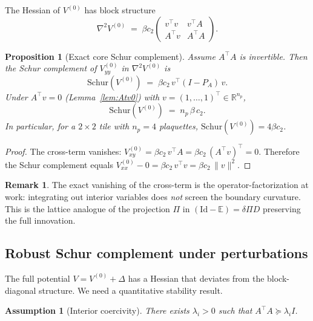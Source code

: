 \documentclass[11pt]{article}
\newtheorem{proposition}[theorem]{Proposition}
\newtheorem{assumption}[theorem]{Assumption}
\theoremstyle{definition}
\newtheorem{remark}[theorem]{Remark}
\newcommand{\E}{\mathbb{E}}
\newcommand{\1}{\mathbf{1}}
\newcommand{\R}{\mathbb{R}}
\newcommand{\norm}[1]{\lVert #1\rVert}
\begin{document}
The Hessian of $V^{(0)}$ has block structure
\begin{equation}\label{eq:hessian}
\nabla^2 V^{(0)} \;=\; \beta c_2
\begin{pmatrix}
v^\top v & v^\top A \\
A^\top v & A^\top A
\end{pmatrix}.
\end{equation}

\begin{proposition}[Exact core Schur complement]\label{prop:core-schur}
Assume $A^\top A$ is invertible.  Then the Schur complement of $V_{yy}^{(0)}$ in $\nabla^2 V^{(0)}$ is
\begin{equation}\label{eq:core-schur}
\mathrm{Schur}(V^{(0)}) \;=\; \beta c_2\,v^\top(I-P_A)\,v.
\end{equation}
Under $A^\top v = 0$ (Lemma~\ref{lem:Atv0}) with $v=(1,\ldots,1)^\top\in\R^{n_p}$,
\begin{equation}\label{eq:schur-value}
\mathrm{Schur}(V^{(0)}) \;=\; n_p\,\beta\, c_2.
\end{equation}
In particular, for a $2\times 2$ tile with $n_p=4$ plaquettes, $\mathrm{Schur}(V^{(0)})=4\beta c_2$.
\end{proposition}

\begin{proof}
The cross-term vanishes: $V_{xy}^{(0)}=\beta c_2\,v^\top A = \beta c_2\,(A^\top v)^\top = 0$.
Therefore the Schur complement equals $V_{xx}^{(0)} - 0 = \beta c_2\,v^\top v = \beta c_2\,\norm{v}^2$.
\end{proof}

\begin{remark}
The exact vanishing of the cross-term is the operator-factorization at work:
integrating out interior variables does \emph{not} screen the boundary curvature.
This is the lattice analogue of the projection $\Pi$ in $(\mathrm{Id}-\E)=\delta\Pi D$
preserving the full innovation.
\end{remark}

\subsection{Robust Schur complement under perturbations}

The full potential $V = V^{(0)}+\Delta$ has a Hessian that deviates from the block-diagonal
structure.  We need a quantitative stability result.

\begin{assumption}[Interior coercivity]\label{ass:coerc}
There exists $\lambda_i>0$ such that $A^\top A\succeq \lambda_i I$.
\end{assumption}
\end{document}
